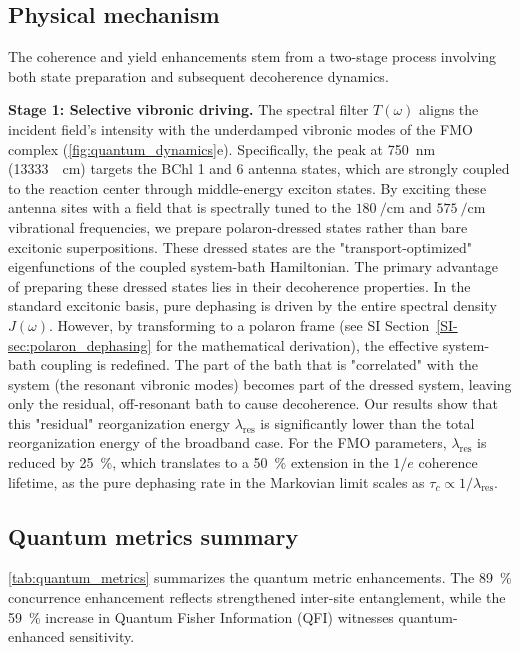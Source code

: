 \documentclass[journal=jpcl,manuscript=letter]{achemso}
\begin{document}
\subsection*{Physical mechanism}

The coherence and yield enhancements stem from a two-stage process involving both state preparation and subsequent decoherence dynamics. 

\textbf{Stage 1: Selective vibronic driving.} The spectral filter $T(\omega)$ aligns the incident field's intensity with the underdamped vibronic modes of the FMO complex (\cref{fig:quantum_dynamics}e). Specifically, the peak at \SI{750}{\nano\meter} (\SI{13333}{\per\centi\meter}) targets the BChl 1 and 6 antenna states, which are strongly coupled to the reaction center through middle-energy exciton states. By exciting these antenna sites with a field that is spectrally tuned to the $\SI{180}{\per\centi\meter}$ and $\SI{575}{\per\centi\meter}$ vibrational frequencies, we prepare polaron-dressed states rather than bare excitonic superpositions. These dressed states are the "transport-optimized" eigenfunctions of the coupled system-bath Hamiltonian.\cite{Chin2013} The primary advantage of preparing these dressed states lies in their decoherence properties. In the standard excitonic basis, pure dephasing is driven by the entire spectral density $J(\omega)$. However, by transforming to a polaron frame (see SI Section~\ref{SI-sec:polaron_dephasing} for the mathematical derivation), the effective system-bath coupling is redefined. The part of the bath that is "correlated" with the system (the resonant vibronic modes) becomes part of the dressed system, leaving only the residual, off-resonant bath to cause decoherence. Our results show that this "residual" reorganization energy $\lambda_{\mathrm{res}}$ is significantly lower than the total reorganization energy of the broadband case. For the FMO parameters, $\lambda_{\mathrm{res}}$ is reduced by \SI{25}{\percent}, which translates to a \SI{50}{\percent} extension in the $1/e$ coherence lifetime, as the pure dephasing rate in the Markovian limit scales as $\tau_c \propto 1/\lambda_{\mathrm{res}}$.

\subsection*{Quantum metrics summary}

\cref{tab:quantum_metrics} summarizes the quantum metric enhancements. The \SI{89}{\percent} concurrence enhancement reflects strengthened inter-site entanglement, while the \SI{59}{\percent} increase in Quantum Fisher Information (QFI) witnesses quantum-enhanced sensitivity.
\end{document}
